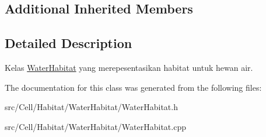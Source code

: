 \subsection*{Additional Inherited Members}


\subsection{Detailed Description}
Kelas \hyperlink{classWaterHabitat}{Water\+Habitat} yang merepesentasikan habitat untuk hewan air. 

The documentation for this class was generated from the following files\+:\begin{DoxyCompactItemize}
\item 
src/\+Cell/\+Habitat/\+Water\+Habitat/Water\+Habitat.\+h\item 
src/\+Cell/\+Habitat/\+Water\+Habitat/Water\+Habitat.\+cpp\end{DoxyCompactItemize}

